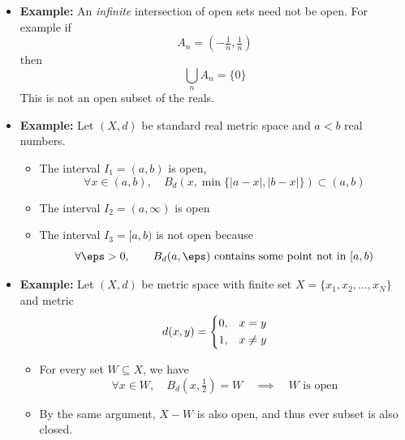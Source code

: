 \documentclass[11pt,twoside]{report}
\begin{document}
\begin{itemize}
\begin{itemize}
\begin{itemize}
\item $X$ is open because $B_d(w_0, \eps) \subseteq X$ is always true definition

\item To show finite union it is sufficient to consider the union of two open sets
\[
W = W_1 \cup W_2
\]
For all $w_0 \in W$, either $w_0 \in W_1$ or $w_0 \in W_2$.  Assume w.l.o.g.\ that $w_0 \in W_1$. Then 
\[
\exists \eps > 0, \; B_d(w_0,\eps) \subseteq W_1 \subseteq W
\]
\end{itemize}


\item \textbf{Example:} An \emph{infinite} intersection of open sets need not be open. For example if 
\[
A_n = (-\tfrac{1}{n} , \tfrac{1}{n})
\]
then
\[
\bigcup_{n} A_n = \{ 0\} 
\]
This is not an open subset of the reals. 


\item \textbf{Example:} Let $(X, d)$ be standard real metric space and $a < b$ real numbers. 
\begin{itemize}
\item The interval $I_1 = (a, b)$ is open, 
\[
\forall x \in (a, b) ,  \quad B_d(x, \min\{ |a-x|, |b-x| \}  ) \subset (a,b) 
\]

\item The interval $I_2 = (a, \infty)$ is open

\item The interval $I_3 = [a, b)$ is not open because 
\[
\forall \eps >0, \qquad B_d(a,\eps)  \text{  contains some point not in $[a,b)$} 
\]

\end{itemize}


\item \textbf{Example:} Let $(X,d)$ be metric space with finite set $X = \{ x_1, x_2, \dots , x_N\}$ and metric
\[
d(x,y) = \begin{dcases} 0, & x  = y\\
1, & x \ne y 
\end{dcases}
\]
\begin{itemize}
\item For every set $W \subseteq X$, we have 
\[
\forall x \in W, \quad B_d(x,\tfrac{1}{2}) = W \quad \implies \quad \text{$W$ is open} 
\]
\item By the same argument, $X  - W$ is also open, and thus ever subset is also closed. 
\end{itemize}




\end{itemize}
\end{itemize}
\end{document}

